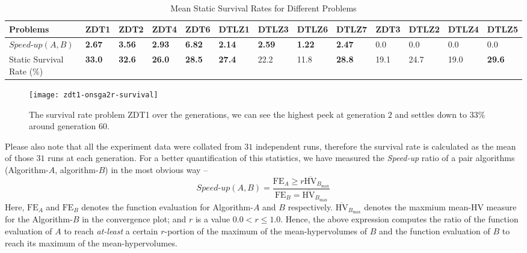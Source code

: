 \documentclass{sig-alternate-05-2015}
\begin{document}
%
\begin{table*}[tp!]
	\caption{Mean Static Survival Rates for Different Problems}
	\label{table:survival}
	\centering
	{\renewcommand{\arraystretch}{1.5}
	\begin{tabular}{l|llllllll|llll}
	Problems		& ZDT1 & ZDT2 & ZDT4 & ZDT6 & DTLZ1 & DTLZ3 & DTLZ6 & DTLZ7 & ZDT3 & DTLZ2 & DTLZ4 & DTLZ5\\ \hline
	$\textit{Speed-up}(A,B)$	& \textbf{2.67} & \textbf{3.56} & \textbf{2.93} & \textbf{6.82} & \textbf{2.14} & \textbf{2.59} & \textbf{1.22} & \textbf{2.47} & 0.0 & 0.0 & 0.0 & 0.0\\ \hline
	Static Survival Rate (\(\%\))	& \textbf{33.0} & \textbf{32.6}	& \textbf{26.0} & \textbf{28.5} & \textbf{27.4} & 22.2 & 11.8 & \textbf{28.8} & 19.1 & 24.7 & 19.0 & \textbf{29.6}\\ \hline
	\end{tabular}}
\end{table*}
%
\begin{figure}[tp]
	\centering
	\texttt{[image: zdt1-onsga2r-survival]}
	\caption{The survival rate problem ZDT1 over the generations, we can see the highest peek at generation \(2\) and settles down to \(33\%\) around generation \(60\).}
	\label{plot:zdt1-survival}
\end{figure}
%
Please also note that all the experiment data were collated from \(31\) independent runs, therefore the survival rate is calculated as the mean of those \(31\) runs at each generation. For a better quantification of this statistics, we have measured the \textit{Speed-up} ratio of a pair algorithms (Algorithm-\(A\), algorithm-\(B\)) in the most obvious way --
%
\begin{equation}
	\textit{Speed-up}(A,B) = \frac{\text{FE}_A \ge r \overline{\text{HV}}_{B_{\text{max}}}}{\text{FE}_B = \overline{\text{HV}}_{B_{\text{max}}}}
	\label{eq:speed-up}
\end{equation}
%
Here, \(\text{FE}_A\) and \(\text{FE}_B\) denotes the function evaluation for Algorithm-\(A\) and \(B\) respectively. \(\overline{\text{HV}}_{B_{\text{max}}}\) denotes the maxmium mean-HV measure for the Algorithm-\(B\) in the convergence plot; and \(r\) is a value \(0.0 < r \le 1.0\). Hence, the above expression computes the ratio of the function evaluation of \(A\) to reach \textit{at-least} a certain \(r\)-portion of the maximum of the mean-hypervolumes of \(B\) and the function evaluation of \(B\) to reach its maximum of the mean-hypervolumes. 
\end{document}
